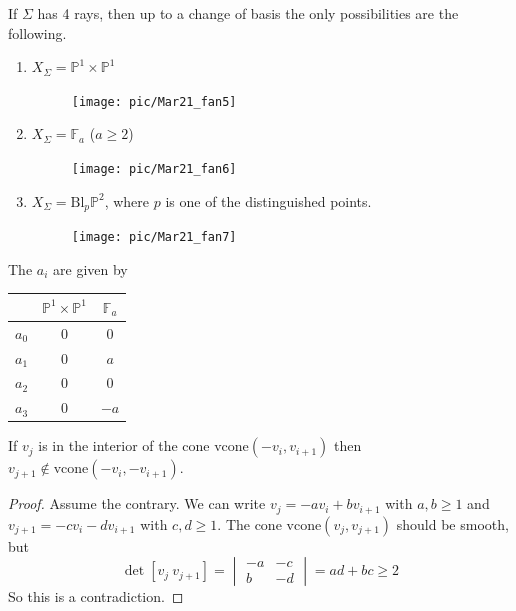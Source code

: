 \documentclass[a4paper,12pt]{amsart}
\newcommand{\PP}{\mathbb{P}}
\begin{document}
\begin{exercise}
	If $\Sigma$ has 4 rays, then up to a change of basis the only possibilities are the following.
	\begin{enumerate}[(1)]
		\item $X_\Sigma=\PP^1\times\PP^1$
		\begin{figure}[h]
			\centering
			\texttt{[image: pic/Mar21\_fan5]}
		\end{figure}
		
		\item $X_\Sigma=\mathbb{F}_a$ ($a\geq 2$)
		\begin{figure}[h]
			\centering
			\texttt{[image: pic/Mar21\_fan6]}
		\end{figure}
		\item $X_\Sigma=\text{Bl}_p\PP^2$, where $p$ is one of the distinguished points.
		\begin{figure}[h]
			\centering
			\texttt{[image: pic/Mar21\_fan7]}
		\end{figure}
	\end{enumerate}
\end{exercise}
\vspace{5cm}

The $a_i$ are given by
\begin{center}
	\begin{tabular}{c|c c} 
		& $\PP^1\times\PP^1$&$\mathbb{F}_a$\\
		\hline
		$a_0$ & 0 & 0\\ 
		$a_1$ & 0 & $a$\\ 
		$a_2$ & 0 & 0\\ 
		$a_3$ & 0 & $-a$\\ 
	\end{tabular}
\end{center}

\begin{Lemma}
	If $v_j$ is in the interior of the cone $\text{vcone}(-v_i,v_{i+1})$ then $v_{j+1}\not\in\text{vcone}(-v_i,-v_{i+1})$.
\end{Lemma}
\begin{proof}
	Assume the contrary. We can write $v_j=-av_i+bv_{i+1}$ with $a,b\geq 1$ and $v_{j+1}=-cv_i-dv_{i+1}$ with $c,d\geq 1$. The cone $\text{vcone}(v_j,v_{j+1})$ should be smooth, but
	$$\det[v_j\ v_{j+1}]=\begin{vmatrix}
	-a&-c\\b&-d
	\end{vmatrix}=ad+bc\geq 2$$
	So this is a contradiction.
\end{proof}
\end{document}
